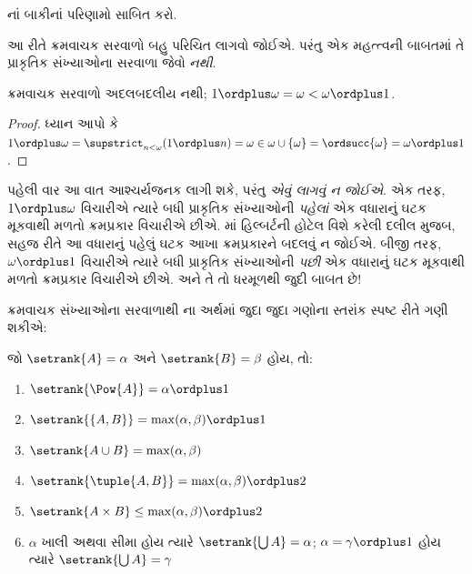 \begin{prob}
નાં
બાકીનાં પરિણામો સાબિત કરો.
\end{prob}

આ રીતે ક્રમવાચક સરવાળો બહુ પરિચિત લાગવો જોઈએ.
પરંતુ એક મહત્ત્વની બાબતમાં તે પ્રાકૃતિક સંખ્યાઓના
સરવાળા જેવો \emph{નથી}.

\begin{prop}
ક્રમવાચક સરવાળો {અદલબદલીય નથી};
$1 \ordplus  \omega = \omega <
\omega \ordplus  1$.
\end{prop}

\begin{proof}
ધ્યાન આપો કે $1 \ordplus  \omega = \supstrict_{n < \omega} (1 \ordplus n)
= \omega \in \omega \cup \{\omega\} = \ordsucc{\omega} = \omega
\ordplus  1$.
\end{proof}
\noindent
પહેલી વાર આ વાત આશ્ચર્યજનક લાગી શકે, પરંતુ
\emph{એવું લાગવું ન જોઈએ}. એક તરફ,
$1 \ordplus  \omega$ વિચારીએ ત્યારે બધી પ્રાકૃતિક
સંખ્યાઓની \emph{પહેલાં} એક વધારાનું ઘટક મૂકવાથી
મળતો ક્રમપ્રકાર વિચારીએ છીએ.
માં હિલ્બર્ટની હોટેલ
વિશે કરેલી દલીલ મુજબ, સહજ રીતે આ વધારાનું પહેલું
ઘટક આખા ક્રમપ્રકારને બદલવું ન જોઈએ. બીજી તરફ,
$\omega \ordplus  1$ વિચારીએ ત્યારે બધી પ્રાકૃતિક
સંખ્યાઓની \emph{પછી} એક વધારાનું ઘટક મૂકવાથી
મળતો ક્રમપ્રકાર વિચારીએ છીએ. અને તે તો ધરમૂળથી
જુદી બાબત છે!
\endgroup

\begingroup
\makeatletter{}\makeatother

\label{guunit:OLP-0577}


ક્રમવાચક સંખ્યાઓના સરવાળાથી
ના અર્થમાં જુદા જુદા
ગણોના સ્તરાંક સ્પષ્ટ રીતે ગણી શકીએ:

\begin{lem}
જો $\setrank{A} = \alpha$ અને $\setrank{B} = \beta$ હોય, તો:
\begin{enumerate}
	\item{} $\setrank{\Pow{A}} = \alpha\ordplus 1$
	\item{} $\setrank{\{A, B\}} = \max(\alpha,
	\beta) \ordplus 1$
	\item{} $\setrank{A \cup B} = \max(\alpha,
	\beta)$
	\item{} $\setrank{\tuple{A,B}} = \max(\alpha,
	\beta) \ordplus  2$
	\item{} $\setrank{A \times B} \leq \max(\alpha,
	\beta) \ordplus  2$
	\item{} $\alpha$ ખાલી અથવા સીમા
	હોય ત્યારે $\setrank{\bigcup A} = \alpha$;
	$\alpha = \gamma\ordplus 1$ હોય ત્યારે
	$\setrank{\bigcup A} = \gamma$
\end{enumerate}
\end{lem}

